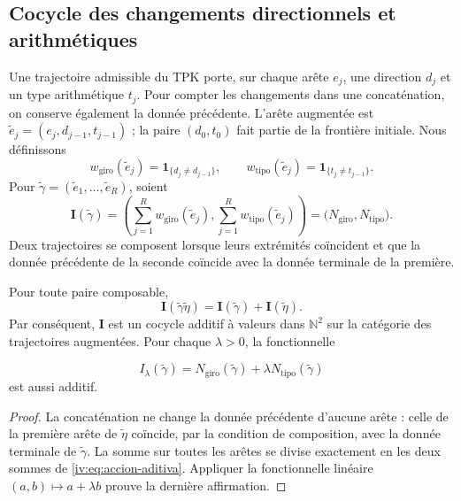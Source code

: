 \subsection{Cocycle des changements directionnels et arithmétiques}

Une trajectoire admissible du TPK porte, sur chaque arête
\(e_j\), une direction \(d_j\) et un type arithmétique
\(t_j\). Pour compter les changements dans une concaténation,
on conserve également la donnée précédente. L’arête augmentée est
\(\widetilde e_j=(e_j,d_{j-1},t_{j-1})\) ; la paire
\((d_0,t_0)\) fait partie de la frontière initiale. Nous définissons
\[
 w_{\mathrm{giro}}(\widetilde e_j)
       =\mathbf1_{\{d_j\ne d_{j-1}\}},\qquad
 w_{\mathrm{tipo}}(\widetilde e_j)
       =\mathbf1_{\{t_j\ne t_{j-1}\}}.
\]
Pour \(\widetilde\gamma=(\widetilde e_1,\ldots,
\widetilde e_R)\), soient
\begin{equation}
 \mathbf I(\widetilde\gamma)=
 \left(\sum_{j=1}^R w_{\mathrm{giro}}(\widetilde e_j),
       \sum_{j=1}^R w_{\mathrm{tipo}}(\widetilde e_j)\right)
 =\bigl(N_{\mathrm{giro}},N_{\mathrm{tipo}}\bigr).
 \label{iv:eq:cociclo-accion}
\end{equation}
Deux trajectoires se composent lorsque leurs extrémités coïncident
et que la donnée précédente de la seconde coïncide avec la donnée
terminale de la première.

\begin{proposition}
\label{iv:prop:accion-aditiva}
Pour toute paire composable,
\begin{equation}
 \mathbf I(\widetilde\gamma\widetilde\eta)
 =\mathbf I(\widetilde\gamma)+\mathbf I(\widetilde\eta).
 \label{iv:eq:accion-aditiva}
\end{equation}
Par conséquent, \(\mathbf I\) est un cocycle additif à valeurs
dans \(\mathbb N^2\) sur la catégorie des trajectoires
augmentées. Pour chaque \(\lambda>0\), la fonctionnelle

\[
 I_\lambda(\widetilde\gamma)
 =N_{\mathrm{giro}}(\widetilde\gamma)
      +\lambda N_{\mathrm{tipo}}(\widetilde\gamma)
\]
est aussi additif.
\end{proposition}
\begin{proof}
La concaténation ne change la donnée précédente d’aucune
arête : celle de la première arête de \(\widetilde\eta\)
coïncide, par la condition de composition, avec la donnée terminale
de \(\widetilde\gamma\). La somme sur toutes les arêtes
se divise exactement en les deux sommes de
\eqref{iv:eq:accion-aditiva}. Appliquer la fonctionnelle linéaire
\((a,b)\mapsto a+\lambda b\) prouve la dernière affirmation.
\end{proof}

